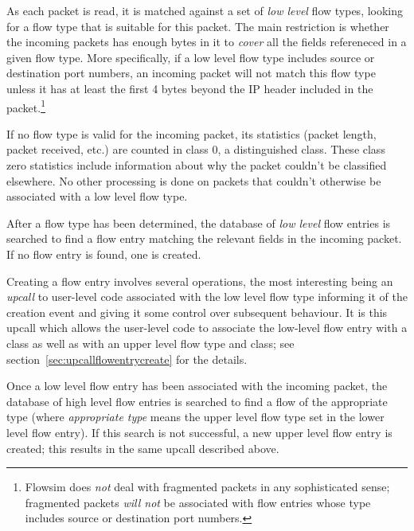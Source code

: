 \documentclass{article}
\begin{document}
As each packet is read, it is matched against a set of \emph{low level}
flow types, looking for a flow type that is suitable for this packet.
The main restriction is whether the incoming packets has enough bytes
in it to \emph{cover} all the fields refereneced in a given flow type.
More specifically, if a low level flow type includes source or
destination port numbers, an incoming packet will not match this flow
type unless it has at least the first 4 bytes beyond the IP header
included in the packet.\footnote{
Flowsim does \emph{not} deal with fragmented packets in any
sophisticated sense; fragmented packets \emph{will not} be associated
with flow entries whose type includes source or destination port
numbers.}

If no flow type is valid for the incoming packet, its statistics
(packet length, packet received, etc.) are counted in class 0, a
distinguished class.  These class zero statistics include information
about why the packet couldn't be classified elsewhere.  No other
processing is done on packets that couldn't otherwise be associated
with a low level flow type.

After a flow type has been determined, the database of \emph{low level}
flow entries is searched to find a flow entry matching the relevant
fields in the incoming packet.  If no flow entry is found, one is
created.

Creating a flow entry involves several operations, the most interesting
being an \emph{upcall} to user-level code associated with the low level
flow type informing it of the creation event and giving it some control
over subsequent behaviour.  It is this upcall which allows the
user-level code to associate the low-level flow entry with a class as
well as with an upper level flow type and class; see
section~\ref{sec:upcallflowentrycreate} for the details.

Once a low level flow entry has been associated with the incoming
packet, the database of high level flow entries is searched to find a
flow of the appropriate type (where \emph{appropriate type} means the
upper level flow type set in the lower level flow entry).  If this
search is not successful, a new upper level flow entry is created; this
results in the same upcall described above.
\end{document}
